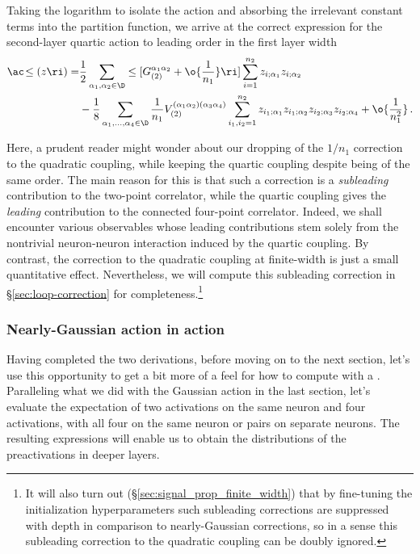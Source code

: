Taking the logarithm to isolate the action and absorbing the irrelevant constant terms into the partition function, we arrive at the correct expression for the second-layer quartic action to leading order in the first layer width
\begin{align}\label{eq:second-layer-quartic-action-in-SD-subsubsection}
\ac\!\le(z\ri)=&\frac{1}{2}\sum_{\alpha_1,\alpha_{2}\in\D}\le[G_{(2)}^{\alpha_1\alpha_2}+\o{\frac{1}{n_1}}\ri]\sum_{i=1}^{n_2} z_{i;\alpha_1}z_{i;\alpha_2}\, \\
&-\frac{1}{8}\sum_{\alpha_1,\ldots,\alpha_4\in\D}\frac{1}{n_1}V_{(2)}^{(\alpha_1\alpha_2)(\alpha_3\alpha_4)}\sum_{i_1,i_2=1}^{n_2} z_{i_1;\alpha_1}z_{i_1;\alpha_2}z_{i_2;\alpha_3}z_{i_2;\alpha_4}+\o{\frac{1}{n_1^2}}\, .\nonumber
\end{align}

Here, a prudent reader might wonder about our dropping of the $1/n_1$ correction to the quadratic coupling, while keeping the quartic coupling despite being of the same order. The main reason for this is that such a correction is a \emph{subleading} contribution to the two-point correlator, while the quartic coupling gives the \emph{leading} contribution to the connected 
four-point correlator. Indeed, we shall encounter various observables whose leading %
contributions stem solely from the nontrivial neuron-neuron interaction induced by the quartic coupling. By contrast, the correction to the quadratic coupling at finite-width is just a small quantitative effect. Nevertheless, we will compute this subleading correction in \S\ref{sec:loop-correction} for completeness.\footnote{It will also turn out (\S\ref{sec:signal_prop_finite_width}) that by fine-tuning the initialization hyperparameters such subleading corrections are suppressed with depth in comparison to nearly-Gaussian corrections, so in a sense this subleading correction to the quadratic coupling can be doubly ignored.}













\subsubsection{Nearly-Gaussian action in action}
Having completed the two derivations, before moving on to the next section, let's use this opportunity to get a bit more of a feel for how to compute with a . Paralleling what we did with the Gaussian action in the last section, let's evaluate the expectation of two activations on the same neuron
and four activations,
with all four on the same neuron or pairs on separate neurons.
The resulting expressions will enable us to obtain the distributions of the preactivations in deeper layers.


